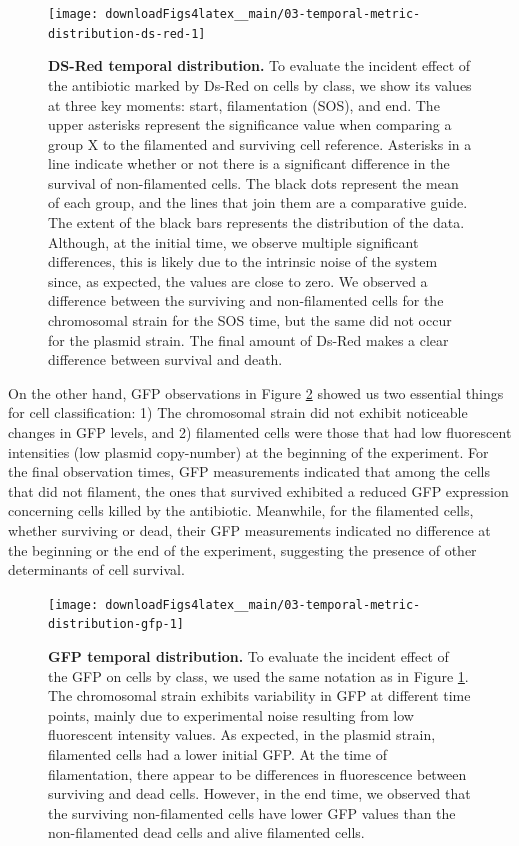 \documentclass[a4paper, nobind]{templates/ociamthesis}
\begin{document}
\begin{figure}[H]
\texttt{[image: downloadFigs4latex\_\_main/03-temporal-metric-distribution-ds-red-1]} \caption[DS-Red temporal distribution.]{\textbf{DS-Red temporal distribution.} To evaluate the incident effect of the antibiotic marked by Ds-Red on cells by class, we show its values at three key moments: start, filamentation (SOS), and end. The upper asterisks represent the significance value when comparing a group X to the filamented and surviving cell reference. Asterisks in a line indicate whether or not there is a significant difference in the survival of non-filamented cells. The black dots represent the mean of each group, and the lines that join them are a comparative guide. The extent of the black bars represents the distribution of the data. Although, at the initial time, we observe multiple significant differences, this is likely due to the intrinsic noise of the system since, as expected, the values are close to zero. We observed a difference between the surviving and non-filamented cells for the chromosomal strain for the SOS time, but the same did not occur for the plasmid strain. The final amount of Ds-Red makes a clear difference between survival and death.}\label{fig:03-temporal-metric-distribution-ds-red-1}
\end{figure}

On the other hand, GFP observations in Figure \ref{fig:03-temporal-metric-distribution-gfp-1} showed us two essential things for cell classification: 1) The chromosomal strain did not exhibit noticeable changes in GFP levels, and 2) filamented cells were those that had low fluorescent intensities (low plasmid copy-number) at the beginning of the experiment.
For the final observation times, GFP measurements indicated that among the cells that did not filament, the ones that survived exhibited a reduced GFP expression concerning cells killed by the antibiotic.
Meanwhile, for the filamented cells, whether surviving or dead, their GFP measurements indicated no difference at the beginning or the end of the experiment, suggesting the presence of other determinants of cell survival.





\begin{figure}[H]
\texttt{[image: downloadFigs4latex\_\_main/03-temporal-metric-distribution-gfp-1]} \caption[GFP temporal distribution.]{\textbf{GFP temporal distribution.} To evaluate the incident effect of the GFP on cells by class, we used the same notation as in Figure \ref{fig:03-temporal-metric-distribution-ds-red-1}. The chromosomal strain exhibits variability in GFP at different time points, mainly due to experimental noise resulting from low fluorescent intensity values. As expected, in the plasmid strain, filamented cells had a lower initial GFP. At the time of filamentation, there appear to be differences in fluorescence between surviving and dead cells. However, in the end time, we observed that the surviving non-filamented cells have lower GFP values than the non-filamented dead cells and alive filamented cells.}\label{fig:03-temporal-metric-distribution-gfp-1}
\end{figure}
\end{document}
